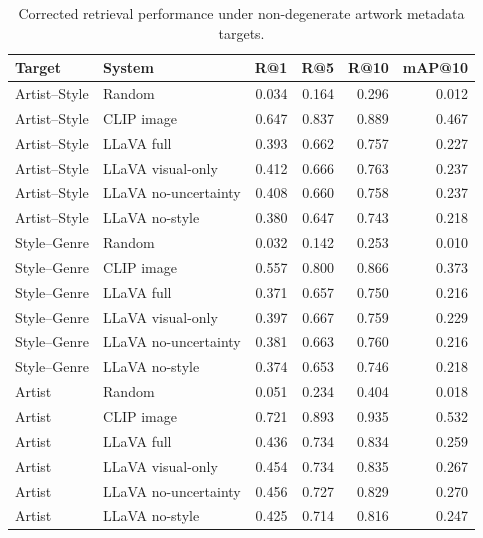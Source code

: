 \begin{table}
\caption{Corrected retrieval performance under non-degenerate artwork metadata targets.}
\label{tab:gala_retrieval_main}
\begin{tabular}{llrrrr}
\toprule
Target & System & R@1 & R@5 & R@10 & mAP@10 \\
\midrule
Artist--Style & Random & 0.034 & 0.164 & 0.296 & 0.012 \\
Artist--Style & CLIP image & 0.647 & 0.837 & 0.889 & 0.467 \\
Artist--Style & LLaVA full & 0.393 & 0.662 & 0.757 & 0.227 \\
Artist--Style & LLaVA visual-only & 0.412 & 0.666 & 0.763 & 0.237 \\
Artist--Style & LLaVA no-uncertainty & 0.408 & 0.660 & 0.758 & 0.237 \\
Artist--Style & LLaVA no-style & 0.380 & 0.647 & 0.743 & 0.218 \\
Style--Genre & Random & 0.032 & 0.142 & 0.253 & 0.010 \\
Style--Genre & CLIP image & 0.557 & 0.800 & 0.866 & 0.373 \\
Style--Genre & LLaVA full & 0.371 & 0.657 & 0.750 & 0.216 \\
Style--Genre & LLaVA visual-only & 0.397 & 0.667 & 0.759 & 0.229 \\
Style--Genre & LLaVA no-uncertainty & 0.381 & 0.663 & 0.760 & 0.216 \\
Style--Genre & LLaVA no-style & 0.374 & 0.653 & 0.746 & 0.218 \\
Artist & Random & 0.051 & 0.234 & 0.404 & 0.018 \\
Artist & CLIP image & 0.721 & 0.893 & 0.935 & 0.532 \\
Artist & LLaVA full & 0.436 & 0.734 & 0.834 & 0.259 \\
Artist & LLaVA visual-only & 0.454 & 0.734 & 0.835 & 0.267 \\
Artist & LLaVA no-uncertainty & 0.456 & 0.727 & 0.829 & 0.270 \\
Artist & LLaVA no-style & 0.425 & 0.714 & 0.816 & 0.247 \\
\bottomrule
\end{tabular}
\end{table}

